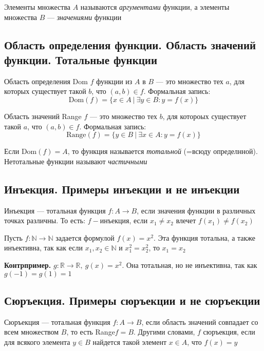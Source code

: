 \documentclass[a4paper]{article}
\begin{document}
 Элементы множества $A$ называются \textit{аргументами} функции, а элементы множества $B$ — \textit{значениями} функции

\subsection{Область определения функции. Область значений функции. Тотальные функции}
 Область определения Dom $f$ функции из $A$ в $B$ — это множество тех $a$, для которых существует такой $b$, что $(a, b)\in f$. Формальная запись:
\begin{equation*}
    \text{Dom}(f)=\{x\in A\ |\ \exists y\in B: y=f(x)\}
\end{equation*}

 Область значений Range $f$ — это множество тех $b$, для котороых существует такой $a$, что $(a, b)\in f$. Формальная запись:
\begin{equation*}
    \text{Range}(f)=\{y\in B\ |\ \exists x\in A: y=f(x)\}
\end{equation*}

 Если Dom$(f)=A$, то функция называется \textit{тотальной} (=всюду определнной). Нетотальные функции называют \textit{частичными}

\subsection{Инъекция. Примеры инъекции и не инъекции}
 Инъекция — тотальная функция $f: A\rightarrow B$, если значения функции в различных точках различны. То есть: $f-$инъекция, если $x_1\ne x_2$ влечет $f(x_1)\ne f(x_2)$

\ex Пусть $f: \mathbb{N}\rightarrow\mathbb{N}$ задается формулой $f(x)=x^2$. Эта функция тотальна, а также инъективна, так как если $x_1, x_2\in \mathbb{N}$ и $x_1^2=x_2^2$, то $x_1=x_2$

\textbf{Контрпример.} $g: \mathbb{R}\rightarrow\mathbb{R},\ g(x)=x^2$. Она тотальная, но не инъективна, так как $g(-1)=g(1)=1$

\subsection{Сюръекция. Примеры сюръекции и не сюръекции}
 Сюръекция — тотальная функция $f: A\rightarrow B$, если область значений совпадает со всем множеством $B$, то есть Range$f=B$. Другими словами, $f$ сюръекция, если для всякого элемента $y\in B$ найдется такой элемент $x\in A$, что $f(x)=y$
\end{document}
